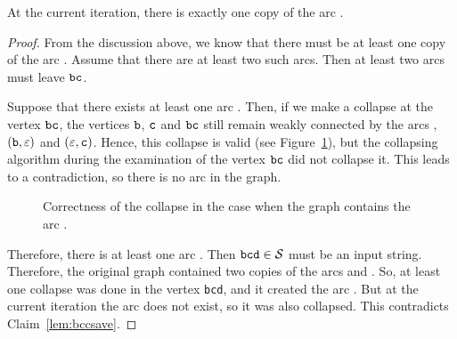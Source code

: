 \begin{lemma}
\label{lem:bbcone}
At the current iteration, there is exactly one copy of the arc .
\end{lemma}
\begin{proof}
From the discussion above, we know that there must be at least one copy of the arc . Assume that there are at least two such arcs. Then at least two arcs must leave $ {\tt bc} $.

Suppose that there exists at least one arc . Then, if we make a collapse at the vertex $ {\tt bc} $, the vertices $ {\tt b} $, $ {\tt c} $ and $ {\tt bc} $ still remain weakly connected by the arcs , $ ({\tt b}, \varepsilon) $ and $ (\varepsilon, {\tt c}) $. Hence, this collapse is valid (see Figure~\ref{fig:lvl1lemmabcc}), but the collapsing algorithm during the examination of the vertex $ {\tt bc} $ did not collapse it. This leads to a contradiction, so there is no arc  in the graph.

\begin{figure}[ht]
\begin{center}

\end{center}

\caption{Correctness of the collapse in the case when the graph contains the arc .}\label{fig:lvl1lemmabcc}
\end{figure}

Therefore, there is at least one arc . Then $ {\tt bcd} \in {\cal S} $ must be an input string. Therefore, the original graph contained two copies of the arcs  and . So, at least one collapse was done in the vertex {\tt bcd}, and it created the arc . But at the current iteration the arc  does not exist, so it was also collapsed. This contradicts Claim~\ref{lem:bccsave}.
\end{proof}


